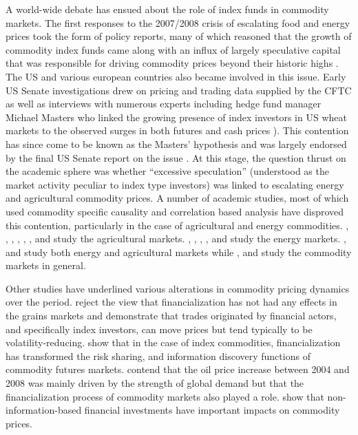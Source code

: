 \documentclass[12pt,]{article}
\begin{document}
A world-wide debate has ensued about the role of index funds in
commodity markets. The first responses to the 2007/2008 crisis of
escalating food and energy prices took the form of policy reports, many
of which reasoned that the growth of commodity index funds came along
with an influx of largely speculative capital that was responsible for
driving commodity prices beyond their historic highs
\citep{de_schutter_food_2010_1, gilbert_speculative_2010, herman_not_2011_1, schumann_hunger-makers_2011, unctad_global_2009}.
The US and various european countries also became involved in this
issue. Early US Senate investigations drew on pricing and trading data
supplied by the CFTC as well as interviews with numerous experts
including hedge fund manager Michael Masters who linked the growing
presence of index investors in US wheat markets to the observed surges
in both futures and cash prices
\citep{masters_testimony_2008, masters_accidental_2008}). This
contention has since come to be known as the Masters' hypothesis and was
largely endorsed by the final US Senate report on the issue
\citep{USSenate_Excessive_speculation_wheat_2009}. At this stage, the
question thrust on the academic sphere was whether ``excessive
speculation'' (understood as the market activity peculiar to index type
investors) was linked to escalating energy and agricultural commodity
prices. A number of academic studies, most of which used commodity
specific causality and correlation based analysis have disproved this
contention, particularly in the case of agricultural and energy
commodities. \citet{irwin_devil_2009}, \citet{sanders_adequacy_2010},
\citet{sanders_impact_2011}, \citet{sanders_new_2011},
\citet{irwin_commodity_2013}, \citet{brunetti_commodity_2014},
\citet{hamilton_effects_2015} and \citet{bruno_financialization_2017}
study the agricultural markets. \citet{buyuksahin_speculators_2011},
\citet{tokic_speculation_2012}, \citet{fattouh_role_2013},
\citet{kilian_role_2014}, \citet{knittel_simple_2016} and
\citet{manera_modelling_2016} study the energy markets.
\citet{bohl_does_2013_2}, \citet{kim_does_2015} and
\citet{boyd_prevalence_2016} study both energy and agricultural markets
while \citet{irwin_index_2011}, \citet{irwin_financialization_2012} and
\citet{stoll_commodity_2011} study the commodity markets in general.

Other studies have underlined various alterations in commodity pricing
dynamics over the period. \citet{gilbert_role_2014} reject the view that
financialization has not had any effects in the grains markets and
demonstrate that trades originated by financial actors, and specifically
index investors, can move prices but tend typically to be
volatility-reducing. \citet{cheng_financialization_2014} show that in
the case of index commodities, financialization has transformed the risk
sharing, and information discovery functions of commodity futures
markets. \citet{juvenal_speculation_2015} contend that the oil price
increase between 2004 and 2008 was mainly driven by the strength of
global demand but that the financialization process of commodity markets
also played a role. \citet{henderson_new_2015} show that
non-information-based financial investments have important impacts on
commodity prices.
\end{document}
